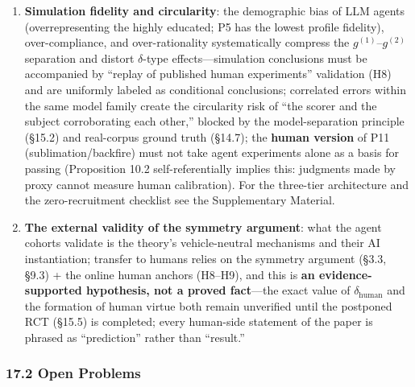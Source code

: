\documentclass[
  11pt]{article}
\begin{document}
\begin{enumerate}
  \textbf{The boundaries of formalization}: the metric \(D\)
  characterizes drift in weight space and does not cover deep
  transformations of belief structure (a worldview-level update is not a
  weight perturbation); the three virtue dimensions
  \((\theta_{\mathrm{cal}}, \theta_{\mathrm{open}}, \theta_{\mathrm{hum}})\)
  are a coarse-grained projection, and the richness of virtue ethics
  cannot be fully operationalized (the warning of Vallor, 2016)---what
  this paper claims is a ``measurable lower bound,'' not a ``complete
  characterization.''
\item
  \textbf{Simulation fidelity and circularity}: the demographic bias of
  LLM agents (overrepresenting the highly educated; P5 has the lowest
  profile fidelity), over-compliance, and over-rationality
  systematically compress the \(g^{(1)}\)--\(g^{(2)}\) separation and
  distort \(\delta\)-type effects---simulation conclusions must be
  accompanied by ``replay of published human experiments'' validation
  (H8) and are uniformly labeled as conditional conclusions; correlated
  errors within the same model family create the circularity risk of
  ``the scorer and the subject corroborating each other,'' blocked by
  the model-separation principle (§15.2) and real-corpus ground truth
  (§14.7); the \textbf{human version} of P11 (sublimation/backfire) must
  not take agent experiments alone as a basis for passing (Proposition
  10.2 self-referentially implies this: judgments made by proxy cannot
  measure human calibration). For the three-tier architecture and the
  zero-recruitment checklist see the Supplementary Material.
\item
  \textbf{The external validity of the symmetry argument}: what the
  agent cohorts validate is the theory's vehicle-neutral mechanisms and
  their AI instantiation; transfer to humans relies on the symmetry
  argument (§3.3, §9.3) + the online human anchors (H8--H9), and this is
  \textbf{an evidence-supported hypothesis, not a proved fact}---the
  exact value of \(\delta_{\mathrm{human}}\) and the formation of human
  virtue both remain unverified until the postponed RCT (§15.5) is
  completed; every human-side statement of the paper is phrased as
  ``prediction'' rather than ``result.''
\end{enumerate}

\subsubsection{17.2 Open Problems}\label{open-problems}
\end{document}

